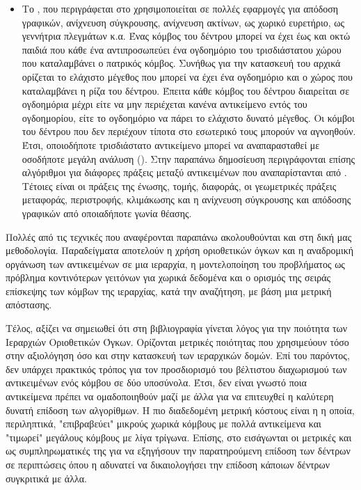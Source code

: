 \begin{itemize}
    \item Το , που περιγράφεται στο \cite{meagher1982geometric}
    χρησιμοποιείται σε πολλές εφαρμογές για απόδοση γραφικών, ανίχνευση σύγκρουσης, 
    ανίχνευση ακτίνων, ως χωρικό ευρετήριο, ως γεννήτρια πλεγμάτων κ.α. 
    Ένας κόμβος του δέντρου μπορεί να έχει έως και οκτώ παιδιά που κάθε ένα
    αντιπροσωπεύει ένα ογδοημόριο του τρισδιάστατου χώρου που καταλαμβάνει ο 
    πατρικός κόμβος.
    Συνήθως για την κατασκευή του αρχικά ορίζεται το ελάχιστο μέγεθος που μπορεί να 
    έχει ένα ογδοημόριο και ο χώρος που καταλαμβάνει η ρίζα του δέντρου. 
    Έπειτα κάθε κόμβος του  δέντρου 
    διαιρείται σε ογδοημόρια μέχρι είτε να μην περιέχεται κανένα αντικείμενο 
    εντός του ογδοημορίου, είτε το ογδοημόριο να πάρει το ελάχιστο δυνατό μέγεθος.
    Οι κόμβοι του δέντρου που δεν περιέχουν τίποτα στο εσωτερικό τους μπορούν να αγνοηθούν.
    Έτσι, οποιοδήποτε τρισδιάστατο αντικείμενο μπορεί να αναπαρασταθεί με οσοδήποτε 
    μεγάλη ανάλυση ().
    Στην παραπάνω δημοσίευση περιγράφονται επίσης αλγόριθμοι για διάφορες πράξεις μεταξύ 
    αντικειμένων που αναπαρίστανται από .
    Τέτοιες είναι οι πράξεις της ένωσης, τομής, διαφοράς, οι γεωμετρικές πράξεις 
    μεταφοράς, περιστροφής, κλιμάκωσης και η ανίχνευση σύγκρουσης και απόδοσης γραφικών 
    από οποιαδήποτε γωνία θέασης. 
\end{itemize}

Πολλές από τις τεχνικές που αναφέρονται παραπάνω ακολουθούνται και 
στη δική μας μεθοδολογία.
Παραδείγματα αποτελούν η χρήση οριοθετικών όγκων και η αναδρομική οργάνωση 
των αντικειμένων σε μια ιεραρχία, η μοντελοποίηση του προβλήματος 
ως πρόβλημα κοντινότερων γειτόνων για χωρικά δεδομένα και ο 
ορισμός της σειράς επίσκεψης των κόμβων της ιεραρχίας, κατά την αναζήτηση, με 
βάση μια μετρική απόστασης.

Τέλος, αξίζει να σημειωθεί ότι στη βιβλιογραφία γίνεται λόγος για την 
ποιότητα των Ιεραρχιών Οριοθετικών Όγκων. 
Ορίζονται μετρικές ποιότητας που χρησιμεύουν τόσο στην αξιολόγηση όσο 
και στην κατασκευή των ιεραρχικών δομών.
Επί του παρόντος, δεν υπάρχει πρακτικός τρόπος για τον προσδιορισμό 
του βέλτιστου διαχωρισμού των αντικειμένων ενός κόμβου σε δύο υποσύνολα.
Έτσι, δεν είναι γνωστό ποια αντικείμενα πρέπει να ομαδοποιηθούν μαζί
με άλλα για να επιτευχθεί η καλύτερη δυνατή επίδοση των αλγορίθμων.
Η πιο διαδεδομένη μετρική κόστους είναι η 
\textit{} 
\cite{goldsmith1987automatic} \cite{macdonald1990heuristics}
η οποία, περιληπτικά, "επιβραβεύει" μικρούς χωρικά κόμβους με πολλά 
αντικείμενα και "τιμωρεί" μεγάλους κόμβους με λίγα τρίγωνα. 
Επίσης, στο \cite{aila2013quality} εισάγωνται οι μετρικές 
 και 
 ως συμπληρωματικές 
της  για να εξηγήσουν την παρατηρούμενη επίδοση 
των δέντρων σε περιπτώσεις όπου η  αδυνατεί να 
δικαιολογήσει την επίδοση κάποιων δέντρων συγκριτικά 
με άλλα.
